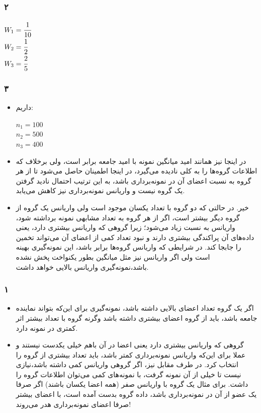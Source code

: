\documentclass[12pt]{article}
\begin{document}
\subsubsection{۲}

	\begin{latin}
	$ 
		W_1 = \cfrac{1}{10} 
	$\\
	$
		W_2 = \cfrac{1}{2} 
		$\\
		$
		W_3 = \cfrac{2}{5}
	$
\end{latin}
\subsubsection{۳}
	\begin{itemize}
		\item 
		داریم:
		\begin{latin}
			$ 
			n_1 = 100 
			$\\
			$
			n_2 = 500
			$\\
			$
			n_3 = 400
			$
		\end{latin}
		\item 
	در اینجا نیز همانند 
	امید میانگین نمونه با امید جامعه برابر است، ولی برخلاف 
	که اطلاعات گروه‌ها را به کلی نادیده می‌گیرد، در اینجا اطمینان حاصل می‌شود تا از هر گروه به نسبت اعضای آن در نمونه‌برداری باشد، به این ترتیب احتمال نادید گرفتن یک گروه نیست و واریانس نمونه‌برداری نیز کاهش می‌یابد.
	\item 
	خیر. در حالتی که دو گروه با تعداد یکسان موجود است ولی واریانس یک گروه از گروه دیگر بیشتر است،‌ اگر از هر گروه به تعداد مشابهی نمونه برداشته شود، واریانس 
	به نسبت زیاد می‌شود؛ زیرا گروهی که واریانس بیشتری دارد، یعنی داده‌های آن پراکندگی بیشتری دارند و نبود تعداد کمی از اعضای آن می‌تواند تخمین را جابجا کند. در شرایطی که واریانس گروه‌ها برابر باشد، این نمونه‌گیری بهینه است ولی اگر واریانس نیز مثل میانگین بطور یکنواخت پخش نشده باشد،‌نمونه‌گیری واریانس بالایی خواهد داشت.



	
	\end{itemize}
	\subsubsection{۱}
	
	\begin{itemize}
		\item 
		اگر یک گروه تعداد اعضای بالایی داشته باشد، نمونه‌گیری برای این‌که بتواند نماینده جامعه باشد،‌ باید از گروه اعضای بیشتری داشته باشد وگرنه گروه با تعداد بیشتر اثر کمتری در نمونه دارد.
		\item 
		گروهی که واریانس بیشتری دارد یعنی اعضا در آن باهم خیلی یکدست نیستند و عملا برای این‌که واریانس نمونه‌برداری کمتر باشد، باید تعداد بیشتری از گروه را انتخاب کرد. در طرف مقابل نیز، اگر گروهی واریانس کمی داشته باشد،‌نیازی نیست تا خیلی از آن نمونه گرفت، با نمونه‌های کمی می‌توان اطلاعات گروه را داشت. برای مثال یک گروه با واریانس صفر (همه اعضا یکسان باشند) اگر صرفا یک عضو از آن در نمونه‌برداری باشد، داده گروه بدست آمده است، با اعضای بیشتر صرفا اعضای نمونه‌برداری هدر می‌روند! 
	\end{itemize}
\end{document}
